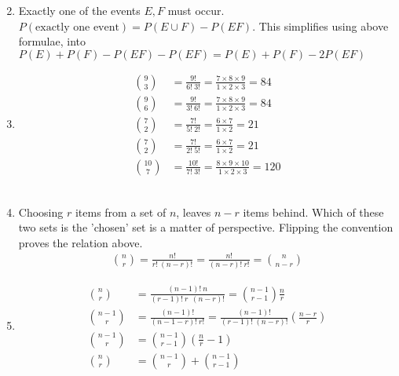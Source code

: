 \begin{enumerate}
\begin{enumerate}
\begin{subequations}
		\end{subequations} 
	\end{enumerate} 
	
	\item Exactly one of the events $ E, F $ must occur.
	$ P(\text{exactly one event}) = P(E \cup F) - P(EF) $. This simplifies using above formulae, into \\
	$ P(E) + P(F) - P(EF) - P(EF) = P(E) + P(F) - 2P(EF)$ \\
	
	\item \begin{subequations}
		\begin{align}
			\binom{9}{3} &= \frac{9!}{6!\ 3!} = \frac{7 \times 8 \times 9}{1 \times 2 \times 3} = 84 \\
			\binom{9}{6} &= \frac{9!}{3!\ 6!} = \frac{7 \times 8 \times 9}{1 \times 2 \times 3} = 84 \\
			\binom{7}{2} &= \frac{7!}{5!\ 2!} = \frac{6 \times 7}{1 \times 2} = 21 \\
			\binom{7}{2} &= \frac{7!}{2!\ 5!} = \frac{6 \times 7}{1 \times 2} = 21 \\
			\binom{10}{7} &= \frac{10!}{7!\ 3!} = \frac{8 \times 9 \times 10}{1 \times 2 \times 3} = 120
		\end{align}
	\end{subequations} \\
	
	\item Choosing $ r $ items from a set of $ n $, leaves $ n-r $ items behind. Which of these two sets is the 'chosen' set is a matter of perspective. Flipping the convention proves the relation above.
	\begin{align}
		\binom{n}{r} = \frac{n!}{r!\ (n-r)!} = \frac{n!}{(n-r)!\ r!} = \binom{n}{n-r}
	\end{align}
	
	\item \begin{subequations}	
		\begin{align}
			\binom{n}{r} &= \frac{(n - 1)!\ n}{(r - 1)!\ r\ \ (n-r)!} = \binom{n-1}{r-1} \frac{n}{r} \\
			\binom{n-1}{r} &= \frac{(n-1)!}{(n-1-r)!\ r!} = \frac{(n-1)!}{(r-1)!\ (n-r)!} \left( \frac{n-r}{r} \right) \\
			\binom{n-1}{r} &= \binom{n-1}{r-1} \left( \frac{n}{r} - 1 \right) \\
			\binom{n}{r} &= \binom{n-1}{r} + \binom{n-1}{r-1} 
		\end{align}
	\end{subequations} \\
	

\end{enumerate}
